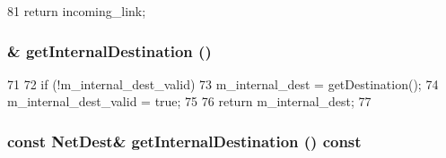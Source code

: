 \begin{DoxyCode}
81 { return incoming_link; }
\end{DoxyCode}
\hypertarget{classNetworkMessage_a403e4121cae865e5d3ef72626a0eb41a}{
\subsubsection[{getInternalDestination}]{\& getInternalDestination ()}}
\label{classNetworkMessage_a403e4121cae865e5d3ef72626a0eb41a}



\begin{DoxyCode}
71     {
72         if (!m_internal_dest_valid) {
73             m_internal_dest = getDestination();
74             m_internal_dest_valid = true;
75         }
76         return m_internal_dest;
77     }
\end{DoxyCode}
\hypertarget{classNetworkMessage_accb0c5be7e478affdc09f47a902df0aa}{
\subsubsection[{getInternalDestination}]{\setlength{\rightskip}{0pt plus 5cm}const {\bf NetDest}\& getInternalDestination () const}}
\label{classNetworkMessage_accb0c5be7e478affdc09f47a902df0aa}



